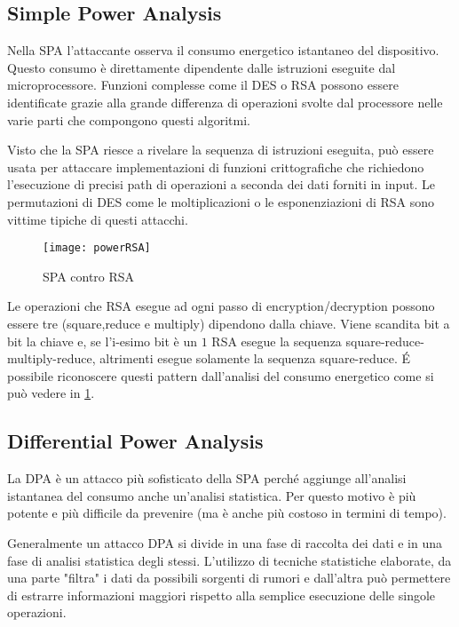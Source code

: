 		\subsection*{Simple Power Analysis}
		Nella \ac{SPA} l'attaccante osserva il consumo energetico istantaneo del dispositivo. Questo consumo è direttamente dipendente dalle istruzioni eseguite dal microprocessore. Funzioni complesse come il \ac{DES} o RSA possono essere identificate grazie alla grande differenza di operazioni svolte dal processore nelle varie parti che compongono questi algoritmi. 
		
		Visto che la \ac{SPA} riesce a rivelare la sequenza di istruzioni eseguita, può essere usata per attaccare implementazioni di funzioni crittografiche che richiedono l'esecuzione di precisi path di operazioni a seconda dei dati forniti in input. Le permutazioni di \ac{DES} come le moltiplicazioni o le esponenziazioni di RSA sono vittime tipiche di questi attacchi.
		
		\begin{figure}
			\begin{center}
				\texttt{[image: powerRSA]}
				\caption{SPA contro RSA}
				\label{fig:RSAPower}
			\end{center}
		\end{figure}
	
		Le operazioni che RSA esegue ad ogni passo di encryption/decryption possono essere tre (square,reduce e multiply) dipendono dalla chiave. Viene scandita bit a bit la chiave e, se l'i-esimo bit è un $1$ RSA esegue la sequenza square-reduce-multiply-reduce, altrimenti esegue solamente la sequenza square-reduce. \'{E} possibile riconoscere questi pattern dall'analisi del consumo energetico come si può vedere in \cref{fig:RSAPower}. 
		
		\subsection*{Differential Power Analysis}
			La \ac{DPA} è un attacco più sofisticato della \ac{SPA} perché aggiunge all'analisi istantanea del consumo anche un'analisi statistica. Per questo motivo è più potente e più difficile da prevenire (ma è anche più costoso in termini di tempo).
			
			Generalmente un attacco \ac{DPA} si divide in una fase di raccolta dei dati e in una fase di analisi statistica degli stessi. L'utilizzo di tecniche statistiche elaborate, da una parte "filtra" i dati da possibili sorgenti di rumori e dall'altra può permettere di estrarre informazioni maggiori rispetto alla semplice esecuzione delle singole operazioni. 
	
